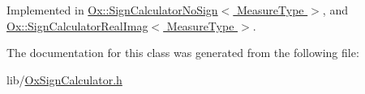 Implemented in \hyperlink{class_ox_1_1_sign_calculator_no_sign_ac480086ad668ac264393b1b18a926221}{Ox\-::\-Sign\-Calculator\-No\-Sign$<$ Measure\-Type $>$}, and \hyperlink{class_ox_1_1_sign_calculator_real_imag_ae3340d1ac5728efcaf3d5a9299f01f2c}{Ox\-::\-Sign\-Calculator\-Real\-Imag$<$ Measure\-Type $>$}.



The documentation for this class was generated from the following file\-:\begin{DoxyCompactItemize}
\item 
lib/\hyperlink{_ox_sign_calculator_8h}{Ox\-Sign\-Calculator.\-h}\end{DoxyCompactItemize}
